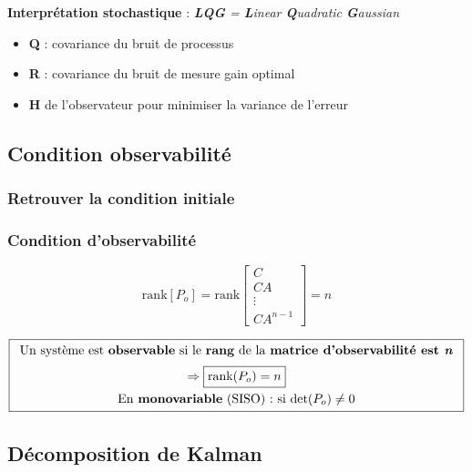 \documentclass[document.tex]{subfiles}
\begin{document}

\begin{flushleft}
\textbf{Interprétation stochastique} : \textit{\textbf{LQG} = \textbf{L}inear \textbf{Q}uadratic \textbf{G}aussian}
\begin{itemize}
\item \textbf{Q} : covariance du bruit de processus
\item \textbf{R} : covariance du bruit de mesure gain optimal
\item \textbf{H} de l'observateur pour minimiser la variance de l'erreur
\end{itemize}
\end{flushleft}

\subsection{Condition observabilité}

\subsubsection{Retrouver la condition initiale}


\subsubsection{Condition d'observabilité}

$$
\boxed{\text{rank}[P_o]=\text{rank} \begin{bmatrix} C \\ CA \\ \vdots \\ CA^{n-1} \end{bmatrix} = n}
$$

$$
\boxed{\begin{array}{c}
\text{Un système est \textbf{observable} si le \textbf{rang} de la \textbf{matrice d'observabilité est \textbf{\textit{n}}}} \\[6pt]
 \Rightarrow \boxed{\text{rank}(P_o) = n} \\[6pt]
\text{En \textbf{monovariable} (SISO) : si } \text{det}(P_o)\neq 0
\end{array}} 
$$

\subsection{Décomposition de Kalman}
\end{document}
